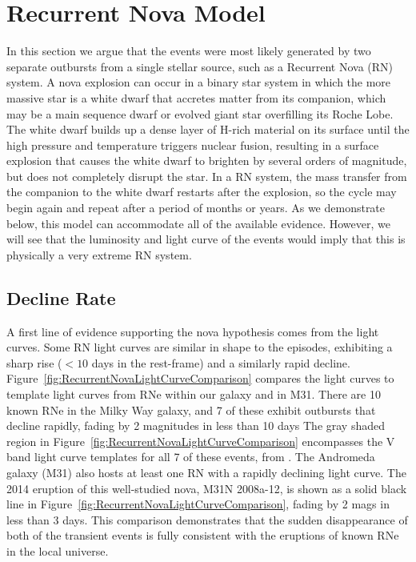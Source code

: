 \section{Recurrent Nova Model}
\label{sec:RecurrentNovaModel}

In this section we argue that the \spock events were most likely
generated by two separate outbursts from a single stellar source, such
as a Recurrent Nova (RN) system. A nova explosion can occur in a
binary star system in which the more massive star is a white dwarf
that accretes matter from its companion, which may be a main sequence
dwarf or evolved giant star overfilling its Roche Lobe. The white
dwarf builds up a dense layer of H-rich material on its surface until
the high pressure and temperature triggers nuclear fusion, resulting
in a surface explosion that causes the white dwarf to brighten by
several orders of magnitude, but does not completely disrupt the
star. In a RN system, the mass transfer from the companion to the
white dwarf restarts after the explosion, so the cycle may begin again
and repeat after a period of months or years.  As we demonstrate
below, this model can accommodate all of the available evidence.
However, we will see that the luminosity and light curve of the \spock
events would imply that this is physically a very extreme RN system.

\subsection{Decline Rate}

A first line of evidence supporting the nova hypothesis comes from the
\spock light curves. Some RN light curves are similar in shape to the
\spock episodes, exhibiting a sharp rise ($<10$ days in the
rest-frame) and a similarly rapid decline.
Figure~\ref{fig:RecurrentNovaLightCurveComparison} compares the \spock
light curves to template light curves from RNe within our galaxy and
in M31.  There are 10 known RNe in the Milky Way galaxy, and 7 of
these exhibit outbursts that decline rapidly, fading by 2 magnitudes
in less than 10 days \citep{Schaefer:2010}
The gray shaded region in
Figure~\ref{fig:RecurrentNovaLightCurveComparison} encompasses the V
band light curve templates for all 7 of these events, from
\citet{Schaefer:2010}.  The Andromeda galaxy (M31) also hosts at least
one RN with a rapidly declining light curve.  The 2014 eruption of
this well-studied nova, M31N 2008a-12, is shown as a solid black line
in Figure~\ref{fig:RecurrentNovaLightCurveComparison}, fading by 2
mags in less than 3 days.  This comparison demonstrates that the
sudden disappearance of both of the \spock transient events is fully
consistent with the eruptions of known RNe in the local universe.

